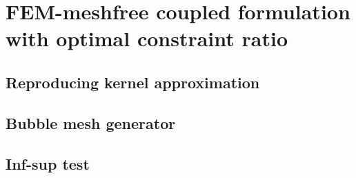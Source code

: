 \section{FEM-meshfree coupled formulation with optimal constraint ratio}
\subsection{Reproducing kernel approximation}
\subsection{Bubble mesh generator}
\subsection{Inf-sup test}
